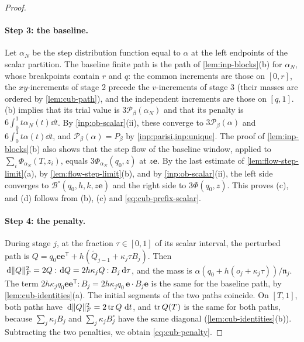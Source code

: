 \begin{proof}
\paragraph{Step 3: the baseline.} Let $\alpha_N$ be the step distribution
function equal to $\alpha$ at the left endpoints of the scalar partition. The
baseline finite path is the path of \cref{lem:inp-blocks}(b) for $\alpha_N$,
whose breakpoints contain $r$ and $q$: the common increments are those on
$[0,r]$, the $xy$-increments of stage $2$ precede the $v$-increments of stage
$3$ (their masses are ordered by \cref{lem:cub-path}), and the independent
increments are those on $[q,1]$. (b) implies that its
trial value is $3\mathcal P_\beta(\alpha_N)$ and that its penalty is
$6\int_0^1t\alpha_N(t)\dd t$.
By \cref{inp:ob-scalar}(ii), these converge to $3\mathcal P_\beta(\alpha)$ and
$6\int_0^1t\alpha(t)\dd t$, and $\mathcal P_\beta(\alpha)=P_\beta$ by
\cref{inp:parisi,inp:unique}. The proof of \cref{lem:inp-blocks}(b) also shows
that the step flow of the baseline window, applied to $\sum_i\Phi_{\alpha_N}(T,z_i)$,
equals $3\Phi_{\alpha_N}(q_0,z)$ at $z\mathbf e$. By the last estimate of
\cref{lem:flow-step-limit}(a), by \cref{lem:flow-step-limit}(b), and by
\cref{inp:ob-scalar}(ii), the left side converges to $\mathcal B^\circ(q_0,h,k,z\mathbf e)$
and the right side to $3\Phi(q_0,z)$. This proves (c), and (d) follows from (b),
(c) and \eqref{eq:cub-prefix-scalar}.

\paragraph{Step 4: the penalty.} During stage $j$, at the fraction $\tau\in[0,1]$
of its scalar interval, the perturbed path is
$Q=q_0\mathbf e\mathbf e^{\mathsf T}+h(\widetilde Q_{j-1}+\kappa_j\tau B_j)$. Then
$\,\mathrm d\lVert Q\rVert_F^2=2Q\mathbin:\,\mathrm d Q=2h\kappa_jQ\mathbin:B_j\,\mathrm d\tau$, and the
mass is $\alpha(q_0+h(o_j+\kappa_j\tau))/\mathfrak n_j$. The term
$2h\kappa_jq_0\mathbf e\mathbf e^{\mathsf T}\mathbin:B_j=2h\kappa_jq_0\,
\mathbf e\cdot B_j\mathbf e$ is the same for the baseline path, by
\cref{lem:cub-identities}(a). The initial segments of the two paths coincide.
On $[T,1]$, both paths have $\,\mathrm d\lVert Q\rVert_F^2=2\operatorname{tr} Q\,\,\mathrm d t$, and $\operatorname{tr} Q(T)$
is the same for both paths, because $\sum_j\kappa_jB_j$ and
$\sum_j\kappa_jB_j^\circ$ have the same diagonal
(\cref{lem:cub-identities}(b)). Subtracting the two penalties, we obtain
\eqref{eq:cub-penalty}.
\end{proof}

